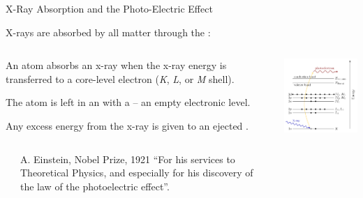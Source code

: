 \begin{slide}{X-Ray Absorption and the Photo-Electric Effect}

  \begin{cenpage}{90mm}
    X-rays are absorbed by all matter through the {}:
  \end{cenpage}

  \begin{columns}[T]
    \begin{column}{50mm}

      
      \vspace{8mm}

      An atom absorbs an x-ray when the x-ray energy is transferred to a
      core-level electron ({\sl{K}}, {\sl{L}}, or {\sl{M}} shell).
      
      \vmm\vmm
      
      The atom is left in an {} with a {} -- an empty electronic level.
      
      \vmm
      Any excess energy from the x-ray is given to an
      ejected {}.

      \vmm
            \vmm

            
        \begin{columns}
          \begin{column}{8mm}
          \end{column}
          \begin{column}{40mm}

            {\tiny{A. Einstein, Nobel Prize, 1921 ``For his services to Theoretical Physics, and
               especially for his discovery of the law of the photoelectric
               effect''.}}

           \vfill
           
          \end{column}
        \end{columns}

      \end{column}
      \begin{column}{66mm}
        \includegraphics[width=65mm]{figs/rimg/photoelectric}

        \vmm  \vfill
      \end{column}
    \end{columns}

    \vmm
    \vfill
\end{slide}


